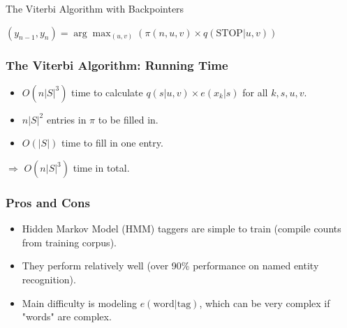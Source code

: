 \documentclass[handout]{beamer}
\begin{document}
\begin{frame}{The Viterbi Algorithm with Backpointers}
\scriptsize
\begin{algorithm}[H]



\BlankLine
\SetAlgoLined
\caption{Viterbi Algorithm with Backpointers}
\label{algo:viterbi}
\BlankLine




\BlankLine
$(y_{n-1}, y_n) = \arg \max_{(u,v)} (\pi(n, u, v) \times q(\text{STOP}|u, v))$ 

\BlankLine
{} 
\end{algorithm}
\end{frame}



\begin{frame}
  \frametitle{The Viterbi Algorithm: Running Time}
  \begin{itemize}
    \item $O(n|S|^3)$ time to calculate $q(s|u, v) \times e(x_k|s)$ for all $k, s, u, v$.
    \item $n|S|^2$ entries in $\pi$ to be filled in.
    \item $O(|S|)$ time to fill in one entry.
  \end{itemize}
  $\Rightarrow$ $O(n|S|^3)$ time in total.
\end{frame}

\begin{frame}
  \frametitle{Pros and Cons}
  \begin{itemize}
    \item Hidden Markov Model (HMM) taggers are simple to train (compile counts from training corpus).
    \item They perform relatively well (over 90\% performance on named entity recognition).
    \item Main difficulty is modeling $e(\text{word} | \text{tag})$, which can be very complex if "words" are complex.
  \end{itemize}
\end{frame}
\end{document}

